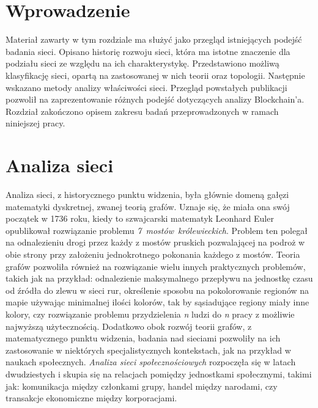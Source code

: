 \documentclass[12pt, twoside, final, openany]{mgr}
\begin{document}
\section{Wprowadzenie}

\indent Materiał zawarty w tym rozdziale ma służyć jako przegląd istniejących podejść badania sieci. Opisano historię rozwoju sieci, która ma istotne znaczenie dla podziału sieci ze względu na ich charakterystykę. Przedstawiono możliwą klasyfikację sieci, opartą na zastosowanej w nich teorii oraz topologii. Następnie wskazano metody analizy właściwości sieci. Przegląd powstałych publikacji pozwolił na zaprezentowanie różnych podejść dotyczących analizy Blockchain'a. Rozdział zakończono opisem zakresu badań przeprowadzonych w ramach niniejszej pracy.

\section{Analiza sieci}

\indent Analiza sieci, z historycznego punktu widzenia, była głównie domeną gałęzi matematyki dyskretnej, zwanej teorią grafów. Uznaje się, że miała ona swój początek w 1736 roku, kiedy to szwajcarski matematyk Leonhard Euler opublikował rozwiązanie problemu \textit{7~mostów~królewieckich}. Problem ten polegał na odnalezieniu drogi przez każdy z mostów pruskich pozwalającej na podroż w obie strony przy założeniu jednokrotnego pokonania każdego z mostów. Teoria grafów pozwoliła również na rozwiązanie wielu innych praktycznych problemów, takich jak na przykład: odnalezienie maksymalnego przepływu na jednostkę czasu od źródła do zlewu w sieci rur, określenie sposobu na pokolorowanie regionów na mapie używając minimalnej ilości kolorów, tak by sąsiadujące regiony miały inne kolory, czy rozwiązanie problemu przydzielenia \textit{n} ludzi do \textit{n} pracy  z możliwie najwyższą użytecznością. Dodatkowo obok rozwój teorii grafów, z matematycznego punktu widzenia, badania nad sieciami pozwoliły na ich zastosowanie w niektórych specjalistycznych kontekstach, jak na przykład w naukach społecznych. \textit{Analiza sieci społecznościowych} rozpoczęła się w latach dwudziestych i skupia się na relacjach pomiędzy jednostkami społecznymi, takimi jak: komunikacja między członkami grupy, handel między narodami, czy transakcje ekonomiczne między korporacjami\cite{BOCCALETTI2006175}.
\end{document}
